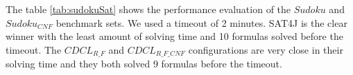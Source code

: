 The table \ref{tab:sudokuSat} shows the performance evaluation of the $Sudoku$ and $Sudoku_{CNF}$ benchmark sets. We used a timeout of 2 minutes. SAT4J is the clear winner with the least amount of solving time and 10 formulas solved before the timeout. The $CDCL_{R\_F}$ and $CDCL_{R\_F\_CNF}$ configurations are very close in their solving time and they both solved 9 formulas before the timeout.